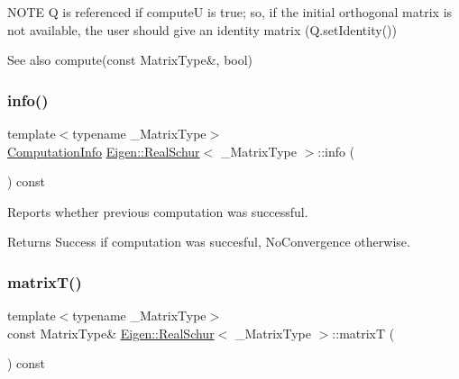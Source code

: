 N\+O\+TE Q is referenced if computeU is true; so, if the initial orthogonal matrix is not available, the user should give an identity matrix (Q.\+set\+Identity())

\begin{DoxySeeAlso}{See also}
compute(const Matrix\+Type\&, bool) 
\end{DoxySeeAlso}
\mbox{\label{class_eigen_1_1_real_schur_a386fd2b1a3a8401eca7183ac074deec8}} 
\subsubsection{\texorpdfstring{info()}{info()}}
{\footnotesize\ttfamily template$<$typename \+\_\+\+Matrix\+Type$>$ \\
\mbox{\hyperlink{group__enums_ga85fad7b87587764e5cf6b513a9e0ee5e}{Computation\+Info}} \mbox{\hyperlink{class_eigen_1_1_real_schur}{Eigen\+::\+Real\+Schur}}$<$ \+\_\+\+Matrix\+Type $>$\+::info (\begin{DoxyParamCaption}{ }\end{DoxyParamCaption}) const\hspace{0.3cm}{\ttfamily [inline]}}



Reports whether previous computation was successful. 

\begin{DoxyReturn}{Returns}
{\ttfamily Success} if computation was succesful, {\ttfamily No\+Convergence} otherwise. 
\end{DoxyReturn}
\mbox{\label{class_eigen_1_1_real_schur_abb78996b43b8642a5f507415730445cb}} 
\subsubsection{\texorpdfstring{matrixT()}{matrixT()}}
{\footnotesize\ttfamily template$<$typename \+\_\+\+Matrix\+Type$>$ \\
const Matrix\+Type\& \mbox{\hyperlink{class_eigen_1_1_real_schur}{Eigen\+::\+Real\+Schur}}$<$ \+\_\+\+Matrix\+Type $>$\+::matrixT (\begin{DoxyParamCaption}{ }\end{DoxyParamCaption}) const\hspace{0.3cm}{\ttfamily [inline]}}



